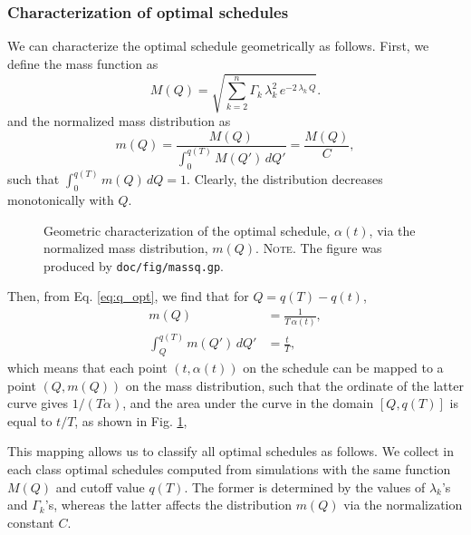 \documentclass[reprint, floatfix]{revtex4-1}
\newcommand{\note}[1]{{\color{DarkGreen}\footnotesize \textsc{Note.} #1}}
\begin{document}
\subsubsection{\label{sec:mass_distr}
Characterization of optimal schedules}



We can characterize the optimal schedule
geometrically as follows.
%
First, we define the mass function as
$$
  M(Q)
  =
  \sqrt{
    \textstyle\sum_{ k = 2 }^n \Gamma_k \, \lambda_k^2 \, e^{-2 \, \lambda_k \, Q}
  }
  .
$$
and the normalized mass distribution as
\begin{equation}
  m(Q)
  =
  \frac{
    M(Q)
  }
  {
    \int_0^{ q(T) } M(Q') \, d Q'
  }
  =
  \frac{
    M(Q)
  }
  {
    C
  }
  ,
\label{eq:mass_distr}
\end{equation}
%
such that
$\int_0^{q(T)} m(Q) \, dQ = 1$.
%
Clearly,
the distribution decreases monotonically with $Q$.


\begin{figure}[h]
\begin{center}
  \caption{
    \label{fig:massq}
    Geometric characterization of the optimal schedule,
    $\alpha(t)$,
    via the normalized mass distribution, $m(Q)$.
    \note{The figure was produced by \texttt{doc/fig/massq.gp}.
    }%
  }
\end{center}
\end{figure}


Then, from Eq. \eqref{eq:q_opt},
we find that for $Q = q(T) - q(t)$,
%
\begin{align}
  m(Q)
  &=
  \frac{ 1 }
       { T \, \alpha(t) }
  ,
\label{eq:mQ_invTa}
  \\
  \int_Q^{ q(T) }
    m(Q') \, dQ'
  &=
  \frac t T
  ,
\label{eq:intmQ_tT}
\end{align}
%
which means that each point $(t, \alpha(t))$
on the schedule can be mapped
to a point $(Q, m(Q))$ on the mass distribution,
such that the ordinate of the latter curve
gives $1/(T\alpha)$,
and the area under the curve in the domain $[Q, q(T)]$
is equal to $t/T$,
as shown in Fig. \ref{fig:massq},

This mapping allows us to classify all optimal schedules
as follows.
%
We collect in each class optimal schedules
computed from simulations with the same function $M(Q)$
and cutoff value $q(T)$.
%
The former is determined by the values of
$\lambda_k$'s and $\Gamma_k$'s,
whereas the latter affects the distribution $m(Q)$
via the normalization constant $C$.
\end{document}

